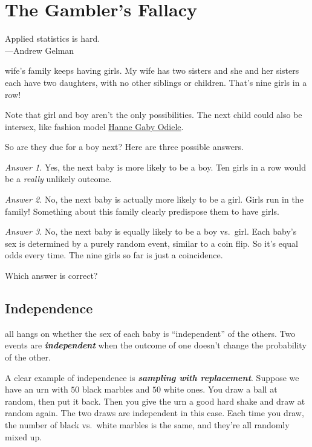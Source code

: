 \documentclass[justified]{tufte-book}
\newenvironment{epigraph}%
{
\begin{flushright}    
\begin{minipage}{20em}
\begin{flushright}
\itshape
}%
{
\end{flushright}
\end{minipage}
\end{flushright}
}
\theoremstyle{definition}
\theoremstyle{definition}
\theoremstyle{definition}
\theoremstyle{remark}
\begin{document}
\hypertarget{the-gamblers-fallacy}{%
\chapter{The Gambler's Fallacy}\label{the-gamblers-fallacy}}

\begin{epigraph}
Applied statistics is hard.\\
---Andrew Gelman
\end{epigraph}

 wife's family keeps having girls. My wife has two sisters and she and her sisters each have two daughters, with no other siblings or children. That's nine girls in a row!

\begin{marginfigure}
Note that girl and boy aren't the only possibilities. The next child
could also be intersex, like fashion model
\href{https://en.wikipedia.org/wiki/Hanne_Gaby_Odiele}{Hanne Gaby
Odiele}.
\end{marginfigure}

So are they due for a boy next? Here are three possible answers.

\emph{Answer 1.} Yes, the next baby is more likely to be a boy. Ten girls in a row would be a \emph{really} unlikely outcome.

\emph{Answer 2.} No, the next baby is actually more likely to be a girl. Girls run in the family! Something about this family clearly predispose them to have girls.

\emph{Answer 3.} No, the next baby is equally likely to be a boy vs.~girl. Each baby's sex is determined by a purely random event, similar to a coin flip. So it's equal odds every time. The nine girls so far is just a coincidence.

Which answer is correct?

\hypertarget{independence}{%
\section{Independence}\label{independence}}

 all hangs on whether the sex of each baby is ``independent'' of the others. Two events are \textbf{\emph{independent}} when the outcome of one doesn't change the probability of the other.

A clear example of independence is \textbf{\emph{sampling with replacement}}. Suppose we have an urn with \(50\) black marbles and \(50\) white ones. You draw a ball at random, then put it back. Then you give the urn a good hard shake and draw at random again. The two draws are independent in this case. Each time you draw, the number of black vs.~white marbles is the same, and they're all randomly mixed up.
\end{document}
